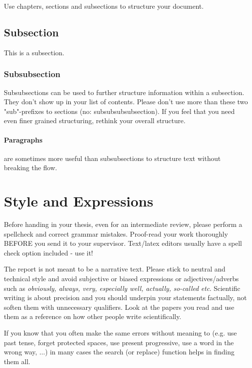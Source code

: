 Use chapters, sections and subsections to structure your document. 

\subsection{Subsection}

This is a subsection. 

\subsubsection{Subsubsection}

Subsubsections can be used to further structure information within a subsection. They don't show up in your list of contents. Please don't use more than these two "sub"-prefixes to sections (no: subsubsubsubsection). If you feel that you need even finer grained structuring, rethink your overall structure.

\paragraph{Paragraphs} are sometimes more useful than subsubsections to structure text without breaking the flow.


\section{Style and Expressions}

Before handing in your thesis, even for an intermediate review, please perform a spellcheck and correct grammar mistakes. Proof-read your work thoroughly BEFORE you send it to your supervisor. Text/latex editors usually have a spell check option included - use it! 

The report is not meant to be a narrative text. Please stick to neutral and technical style and avoid subjective or biased expressions or adjectives/adverbs such as \emph{obviously, always, very, especially well, actually, so-called etc}. Scientific writing is about precision and you should underpin your statements factually, not soften them with unnecessary qualifiers. Look at the papers you read and use them as a reference on how other people write scientifically.

If you know that you often make the same errors without meaning to (e.g. use past tense, forget protected spaces, use present progressive, use a word in the wrong way, $\ldots$) in many cases the search (or replace) function helps in finding them all.

